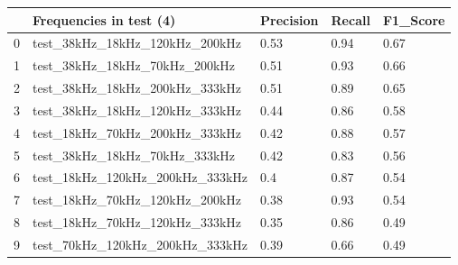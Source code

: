 \begin{longtable}{lllll}
\hline
\multicolumn{1}{|l|}{} & \multicolumn{1}{l|}{Frequencies in test (4)} & \multicolumn{1}{l|}{Precision} & \multicolumn{1}{l|}{Recall} & \multicolumn{1}{l|}{F1\_Score} \\ \hline
\endfirsthead
%
\endhead
%
\hline
\endfoot
%
\endlastfoot
%
0                      & test\_38kHz\_18kHz\_120kHz\_200kHz          & 0.53                           & 0.94                        & 0.67                           \\
1                      & test\_38kHz\_18kHz\_70kHz\_200kHz           & 0.51                           & 0.93                        & 0.66                           \\
2                      & test\_38kHz\_18kHz\_200kHz\_333kHz          & 0.51                           & 0.89                        & 0.65                           \\
3                      & test\_38kHz\_18kHz\_120kHz\_333kHz          & 0.44                           & 0.86                        & 0.58                           \\
4                      & test\_18kHz\_70kHz\_200kHz\_333kHz          & 0.42                           & 0.88                        & 0.57                           \\
5                      & test\_38kHz\_18kHz\_70kHz\_333kHz           & 0.42                           & 0.83                        & 0.56                           \\
6                      & test\_18kHz\_120kHz\_200kHz\_333kHz         & 0.4                            & 0.87                        & 0.54                           \\
7                      & test\_18kHz\_70kHz\_120kHz\_200kHz          & 0.38                           & 0.93                        & 0.54                           \\
8                      & test\_18kHz\_70kHz\_120kHz\_333kHz          & 0.35                           & 0.86                        & 0.49                           \\
9                      & test\_70kHz\_120kHz\_200kHz\_333kHz         & 0.39                           & 0.66                        & 0.49                           \\

\end{longtable}
